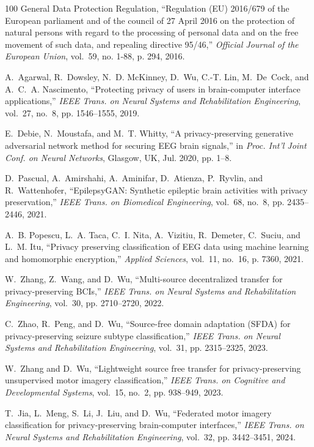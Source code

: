 \documentclass[journal]{IEEEtran}
\begin{document}
\begin{thebibliography}{100}
{General Data Protection Regulation}, ``Regulation ({EU}) 2016/679 of the
  {European} parliament and of the council of 27 {April} 2016 on the protection
  of natural persons with regard to the processing of personal data and on the
  free movement of such data, and repealing directive 95/46,'' \emph{Official
  Journal of the European Union}, vol.~59, no. 1-88, p. 294, 2016.

A.~Agarwal, R.~Dowsley, N.~D. McKinney, D.~Wu, C.-T. Lin, M.~De~Cock, and
  A.~C.~A. Nascimento, ``Protecting privacy of users in brain-computer
  interface applications,'' \emph{{IEEE} Trans. on Neural Systems and
  Rehabilitation Engineering}, vol.~27, no.~8, pp. 1546--1555, 2019.

E.~Debie, N.~Moustafa, and M.~T. Whitty, ``A privacy-preserving generative
  adversarial network method for securing {EEG} brain signals,'' in \emph{Proc.
  Int'l Joint Conf. on Neural Networks}, Glasgow, UK, Jul. 2020, pp. 1--8.

D.~Pascual, A.~Amirshahi, A.~Aminifar, D.~Atienza, P.~Ryvlin, and
  R.~Wattenhofer, ``{EpilepsyGAN}: Synthetic epileptic brain activities with
  privacy preservation,'' \emph{IEEE Trans. on Biomedical Engineering},
  vol.~68, no.~8, pp. 2435--2446, 2021.

A.~B. Popescu, L.~A. Taca, C.~I. Nita, A.~Vizitiu, R.~Demeter, C.~Suciu, and
  L.~M. Itu, ``Privacy preserving classification of {EEG} data using machine
  learning and homomorphic encryption,'' \emph{Applied Sciences}, vol.~11,
  no.~16, p. 7360, 2021.

W.~Zhang, Z.~Wang, and D.~Wu, ``Multi-source decentralized transfer for
  privacy-preserving {BCIs},'' \emph{IEEE Trans. on Neural Systems and
  Rehabilitation Engineering}, vol.~30, pp. 2710--2720, 2022.

C.~Zhao, R.~Peng, and D.~Wu, ``Source-free domain adaptation ({SFDA}) for
  privacy-preserving seizure subtype classification,'' \emph{IEEE Trans. on
  Neural Systems and Rehabilitation Engineering}, vol.~31, pp. 2315--2325,
  2023.

W.~Zhang and D.~Wu, ``Lightweight source free transfer for privacy-preserving
  unsupervised motor imagery classification,'' \emph{IEEE Trans. on Cognitive
  and Developmental Systems}, vol.~15, no.~2, pp. 938--949, 2023.

T.~Jia, L.~Meng, S.~Li, J.~Liu, and D.~Wu, ``Federated motor imagery
  classification for privacy-preserving brain-computer interfaces,'' \emph{IEEE
  Trans. on Neural Systems and Rehabilitation Engineering}, vol.~32, pp.
  3442--3451, 2024.


\end{thebibliography}
\end{document}
